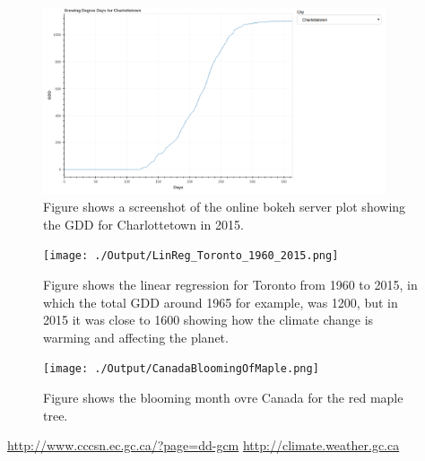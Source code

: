 \documentclass[12pt]{article}
\begin{document}
	\begin{figure}[!htbp]
		\centering
		\includegraphics[width=0.9\textwidth]{./Report/bokeh_serve_screenshot.png} 
		\caption{\scriptsize Figure shows a screenshot of the online bokeh server plot showing the
		GDD for Charlottetown in 2015.}\label{BokehServer}		  
	\end{figure}
	
	\begin{figure}[!htbp]
		\centering
		\texttt{[image: ./Output/LinReg\_Toronto\_1960\_2015.png]} 
		\caption{\scriptsize Figure shows the linear regression for Toronto from 1960 to 2015, 
		in which the total GDD around 1965 for example, was 1200, but in 2015 it was close to 
		1600 showing how the climate change is warming and affecting the planet.}\label{LinReg}		  
	\end{figure}

	\begin{figure}[!htbp]
		\centering
		\texttt{[image: ./Output/CanadaBloomingOfMaple.png]} 
		\caption{\scriptsize Figure shows the blooming month ovre Canada for the red maple tree.}\label{gddMapCaMaple}		  
	\end{figure}

\pagebreak
\begin{thebibliography}{2}
\url{http://www.cccsn.ec.gc.ca/?page=dd-gcm}
\url{http://climate.weather.gc.ca}
\end{thebibliography}
\end{document}

